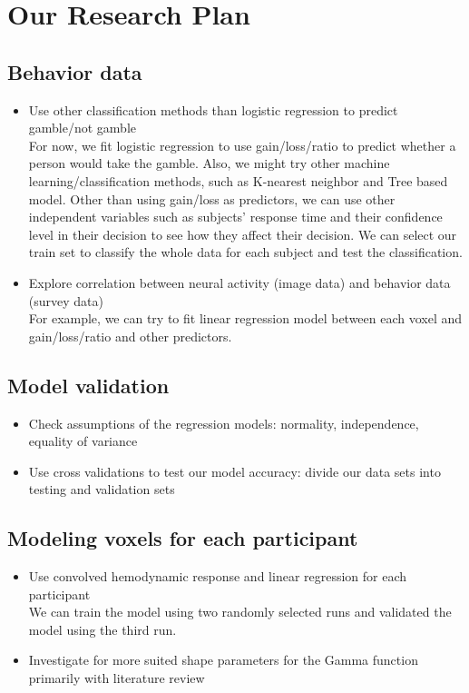 \section{Our Research Plan}
\subsection{Behavior data}
\begin{itemize}
\item Use other classification methods than logistic regression to predict gamble/not 
gamble\\
For now, we fit logistic regression to use gain/loss/ratio to predict whether a person would take the gamble. Also, we might try other machine learning/classification methods, such as K-nearest neighbor and Tree based model. Other than using gain/loss as predictors, we can use other independent variables such as subjects’ response time and their confidence level in their decision to see how they affect their decision. We can select our train set to classify the whole data for each subject and test the classification.
\item Explore correlation between neural activity (image data) and behavior data (survey data)\\
For example, we can try to fit linear regression model between each voxel and gain/loss/ratio and other predictors.
\end{itemize}

\subsection{Model validation}
\begin{itemize}
\item Check assumptions of the regression models: normality, independence, equality of  variance
\item Use cross validations to test our model accuracy: divide our data sets into testing and validation sets
\end{itemize}
\subsection{Modeling voxels for each participant}
\begin{itemize}
\item Use convolved hemodynamic response and linear regression for each participant\\
We can train the model using two randomly selected runs and validated the model using the third run.
\item Investigate for more suited shape parameters for the Gamma function primarily with literature review
\end{itemize}
